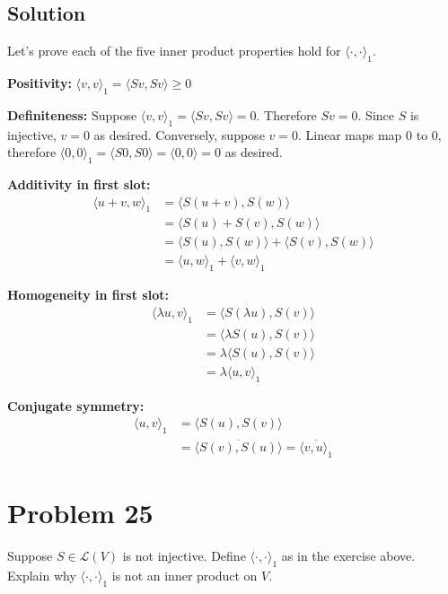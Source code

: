 \documentclass{article}
\begin{document}
\subsection*{Solution}
Let's prove each of the five inner product properties hold for $\langle \cdot,\cdot \rangle_1$.

\vs

\textbf{Positivity:} $\langle v,v\rangle_1=\langle Sv, Sv\rangle\geq 0$

\vs

\textbf{Definiteness:} Suppose $\langle v,v\rangle_1=\langle Sv, Sv\rangle=0$. Therefore $Sv=0$. Since $S$ is injective, $v=0$ as desired. Conversely, suppose $v=0$. Linear maps map $0$ to $0$, therefore $\langle 0,0\rangle_1=\langle S0, S0\rangle=\langle 0,0\rangle=0$ as desired.

\vs

\textbf{Additivity in first slot:}
\begin{align*}
\langle u+v,w\rangle_1&=\langle S(u+v), S(w)\rangle\\
&=\langle S(u)+S(v), S(w)\rangle\\
&=\langle S(u), S(w)\rangle+\langle S(v), S(w)\rangle\\
&=\langle u,w\rangle_1+\langle v,w\rangle_1
\end{align*}

\vs

\textbf{Homogeneity in first slot:}
\begin{align*}
    \langle \lambda u, v\rangle_1&=\langle S(\lambda u), S(v)\rangle\\
    &=\langle \lambda S(u), S(v)\rangle\\
    &=\lambda\langle S(u), S(v)\rangle\\
    &=\lambda \langle u, v\rangle_1
\end{align*}

\vs

\textbf{Conjugate symmetry:}
\begin{align*}
    \langle u,v \rangle_1&=\langle S(u), S(v)\rangle\\
    &=\overline{\langle S(v), S(u)\rangle}=\overline{\langle v,u\rangle_1}
\end{align*}

\section*{Problem 25}
Suppose $S\in\mathcal{L}(V)$ is not injective. Define $\langle\cdot,\cdot\rangle_1$ as in the exercise above. Explain why $\langle\cdot,\cdot\rangle_1$ is not an inner product on $V$.
\end{document}
